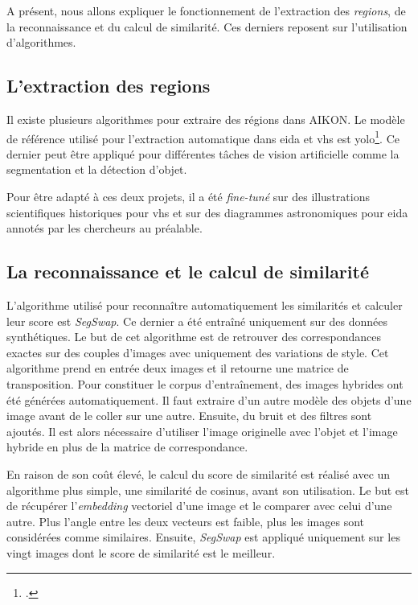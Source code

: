 A présent, nous allons expliquer le fonctionnement de l'extraction des \textit{regions}, de la reconnaissance et du calcul de similarité. Ces derniers reposent sur l'utilisation d'algorithmes.

\subsection{L'extraction des regions}

Il existe plusieurs algorithmes pour extraire des régions dans AIKON. Le modèle de référence utilisé pour l'extraction automatique dans \gls{eida} et \gls{vhs} est \gls{yolo}\footcite{jocherYOLOv5Ultralytics2020}. Ce dernier peut être appliqué pour différentes tâches de vision artificielle comme la segmentation et la détection d'objet.

Pour être adapté à ces deux projets, il a été \textit{fine-tuné} sur des illustrations scientifiques historiques pour \gls{vhs} et sur des diagrammes astronomiques pour \gls{eida} annotés par les chercheurs au préalable. 


\subsection{La reconnaissance et le calcul de similarité}

L'algorithme utilisé pour reconnaître automatiquement les similarités et calculer leur score est \textit{SegSwap}. Ce dernier a été entraîné uniquement sur des données synthétiques. Le but de cet algorithme est de retrouver des correspondances exactes sur des couples d'images avec uniquement des variations de style.
Cet algorithme prend en entrée deux images et il retourne une matrice de transposition. Pour constituer le corpus d'entraînement, des images hybrides ont été générées automatiquement. Il faut extraire d'un autre modèle des objets d'une image avant de le coller sur une autre. Ensuite, du bruit et des filtres sont ajoutés. Il est alors nécessaire d'utiliser l'image originelle avec l'objet et l'image hybride en plus de la matrice de correspondance. 

En raison de son coût élevé, le calcul du score de similarité est réalisé avec un algorithme plus simple, une similarité de cosinus, avant son utilisation. Le but est de récupérer l'\textit{embedding} vectoriel d'une image et le comparer avec celui d'une autre. Plus l'angle entre les deux vecteurs est faible, plus les images sont considérées comme similaires. Ensuite, \textit{SegSwap} est appliqué uniquement sur les vingt images dont le score de similarité est le meilleur.


